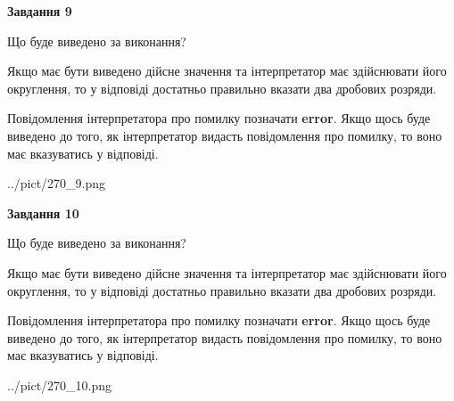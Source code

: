 \documentclass[12pt, ukrainian]{article}
\begin{document}
{\begin {Large}
{\begin {center}\textbf{Завдання 9}\end {center}}\par
Що буде виведено за виконання? \par

Якщо має бути виведено дійсне значення та інтерпретатор має здійснювати його округлення, 
то у відповіді достатньо правильно вказати два дробових розряди.

Повідомлення інтерпретатора про помилку позначати \textbf{error}.
Якщо щось буде виведено до того, як інтерпретатор видасть повідомлення про помилку, 
то воно має вказуватись у відповіді. \par

\begin{center}
	{../pict/270_9.png}
\end{center}
\newpage

{\begin {center}\textbf{Завдання 10}\end {center}}\par
Що буде виведено за виконання? \par

Якщо має бути виведено дійсне значення та інтерпретатор має здійснювати його округлення, 
то у відповіді достатньо правильно вказати два дробових розряди.

Повідомлення інтерпретатора про помилку позначати \textbf{error}.
Якщо щось буде виведено до того, як інтерпретатор видасть повідомлення про помилку, 
то воно має вказуватись у відповіді. \par

\begin{center}
	{../pict/270_10.png}
\end{center}
\newpage

\end {Large}}
\end{document}
